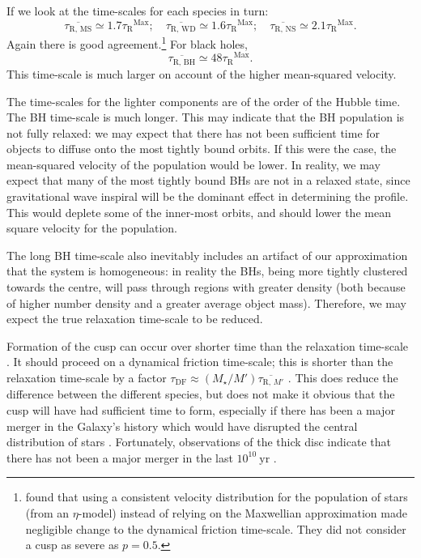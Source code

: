 \documentclass[useAMS,usedcolumn,usegraphicx,usenatbib]{mn2e}
\newcommand{\units}[1]{\ensuremath{~\mathrm{#1}}}
\newcommand{\sub}[1]{\ensuremath{_\mathrm{#1}}}
\newcommand{\super}[1]{\ensuremath{^\mathrm{#1}}}
\begin{document}
\begin{onecolumn}
If we look at the time-scales for each species in turn:
\begin{equation}
\overline{\tau\sub{R,\,MS}} \simeq 1.7 \tau\sub{R}\super{Max};\quad \overline{\tau\sub{R,\,WD}} \simeq 1.6 \tau\sub{R}\super{Max};\quad \overline{\tau\sub{R,\,NS}} \simeq 2.1 \tau\sub{R}\super{Max}.
\end{equation}
Again there is good agreement.\footnote{\citet*{Freitag2006} found that using a consistent velocity distribution for the population of stars (from an $\eta$-model) instead of relying on the Maxwellian approximation made negligible change to the dynamical friction time-scale. They did not consider a cusp as severe as $p = 0.5$.} For black holes,
\begin{equation}
\overline{\tau\sub{R,\,BH}} \simeq 48 \tau\sub{R}\super{Max}.
\end{equation}
This time-scale is much larger on account of the higher mean-squared velocity.

The time-scales for the lighter components are of the order of the Hubble time. The BH time-scale is much longer. This may indicate that the BH population is not fully relaxed: we may expect that there has not been sufficient time for objects to diffuse onto the most tightly bound orbits. If this were the case, the mean-squared velocity of the population would be lower. In reality, we may expect that many of the most tightly bound BHs are not in a relaxed state, since gravitational wave inspiral will be the dominant effect in determining the profile. This would deplete some of the inner-most orbits, and should lower the mean square velocity for the population.

The long BH time-scale also inevitably includes an artifact of our approximation that the system is homogeneous: in reality the BHs, being more tightly clustered towards the centre, will pass through regions with greater density (both because of higher number density and a greater average object mass). Therefore, we may expect the true relaxation time-scale to be reduced.

Formation of the cusp can occur over shorter time than the relaxation time-scale \citep{Bar-Or2012}. It should proceed on a dynamical friction time-scale; this is shorter than the relaxation time-scale by a factor $\tau\sub{DF} \approx (M_\star/M')\overline{\tau_{\mathrm{R},\,M'}}$ \citep[section 3.4]{Spitzer1987}. This does reduce the difference between the different species, but does not make it obvious that the cusp will have had sufficient time to form, especially if there has been a major merger in the Galaxy's history which would have disrupted the central distribution of stars \citep{Gualandris2012}. Fortunately, observations of the thick disc indicate that there has not been a major merger in the last $10^{10}\units{yr}$ \citep{Wyse2008}.


\end{onecolumn}
\end{document}
